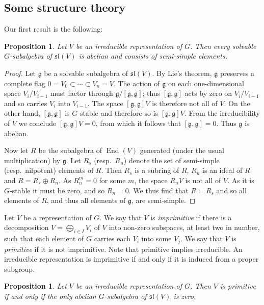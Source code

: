 \documentclass{amsart}
\newtheorem{proposition}[theorem]{Proposition}
\theoremstyle{definition}
\theoremstyle{remark}
\DeclareMathOperator{\End}{End}
\let\mf\mathfrak
\begin{document}
\subsection{Some structure theory}

Our first result is the following:

\begin{proposition}
\label{prop:solv}
Let $V$ be an irreducible representation of $G$.  Then every solvable $G$-subalgebra of $\mf{sl}(V)$ is abelian and
consists of semi-simple elements.
\end{proposition}

\begin{proof}
Let $\mf{g}$ be a solvable subalgebra of $\mf{sl}(V)$.  By Lie's theorem, $\mf{g}$ preserves a complete flag $0=V_0
\subset \cdots \subset V_n=V$.  The action of $\mf{g}$ on each one-dimensional space $V_i/V_{i-1}$ must factor through
$\mf{g}/[\mf{g}, \mf{g}]$; thus $[\mf{g}, \mf{g}]$ acts by zero on $V_i/V_{i-1}$ and so carries $V_i$ into $V_{i-1}$.
The space $[\mf{g}, \mf{g}] V$ is therefore not all of $V$.  On the other hand, $[\mf{g}, \mf{g}]$ is $G$-stable and
therefore so is $[\mf{g}, \mf{g}] V$.  From the irreducibility of $V$ we conclude $[\mf{g}, \mf{g}] V=0$, from which it
follows that $[\mf{g}, \mf{g}]=0$.  Thus $\mf{g}$ is abelian.

Now let $R$ be the subalgebra of $\End(V)$ generated (under the usual multiplication) by $\mf{g}$.  Let $R_s$
(resp.\ $R_n$) denote the set of semi-simple (resp.\ nilpotent) elements of $R$.  Then $R_s$ is a subring of $R$, $R_n$
is an ideal of $R$ and $R=R_s \oplus R_n$.  As $R_n^m=0$ for some $m$, the space $R_n V$ is not all of $V$.  As it is
$G$-stable it must be zero, and so $R_n=0$.  We thus find that $R=R_s$ and so all elements of $R$, and thus all elements
of $\mf{g}$, are semi-simple.
\end{proof}

Let $V$ be a representation of $G$.  We say that $V$ is \emph{imprimitive} if there is a decomposition
$V=\bigoplus_{i \in I} V_i$ of $V$ into non-zero subspaces, at least two in number, such that each element of $G$
carries each $V_i$ into some $V_j$.  We say that $V$ is \emph{primitive} if it is not imprimitive.  Note that primitive
implies irreducible.  An irreducible representation is imprimitive if and only if it is induced from a proper subgroup.

\begin{proposition}
\label{prop:prim}
Let $V$ be an irreducible representation of $G$.  Then $V$ is primitive if and only if the only abelian $G$-subalgebra
of $\mf{sl}(V)$ is zero.
\end{proposition}
\end{document}
